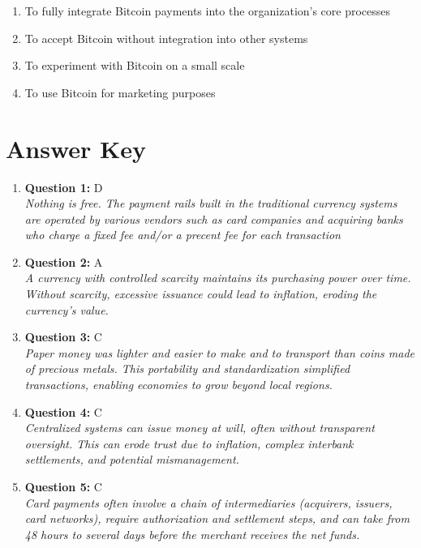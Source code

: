 \documentclass[12pt,a4paper]{article}
\begin{document}
\begin{enumerate}[label=\Alph*., leftmargin=*]
\item To fully integrate Bitcoin payments into the organization's core processes
\item To accept Bitcoin without integration into other systems
\item To experiment with Bitcoin on a small scale
\item To use Bitcoin for marketing purposes
\end{enumerate}

\bigskip


\newpage
\section*{Answer Key}

\begin{enumerate}
\item \textbf{Question 1:} D
\\ \textit{Nothing is free. The payment rails built in the traditional currency systems are operated by various vendors such as card companies and acquiring banks who charge a fixed fee and/or a precent fee for each transaction}

\item \textbf{Question 2:} A
\\ \textit{A currency with controlled scarcity maintains its purchasing power over time. Without scarcity, excessive issuance could lead to inflation, eroding the currency’s value.}

\item \textbf{Question 3:} C
\\ \textit{Paper money was lighter and easier to make and to transport than coins made of precious metals. This portability and standardization simplified transactions, enabling economies to grow beyond local regions.}

\item \textbf{Question 4:} C
\\ \textit{Centralized systems can issue money at will, often without transparent oversight. This can erode trust due to inflation, complex interbank settlements, and potential mismanagement.}

\item \textbf{Question 5:} C
\\ \textit{Card payments often involve a chain of intermediaries (acquirers, issuers, card networks), require authorization and settlement steps, and can take from 48 hours to several days before the merchant receives the net funds.}


\end{enumerate}
\end{document}
